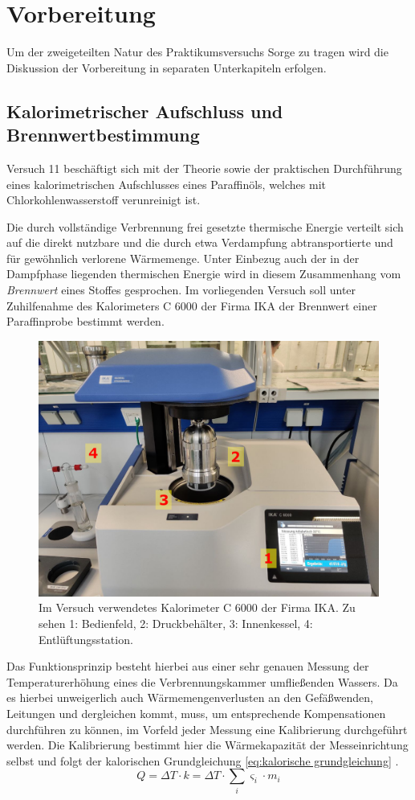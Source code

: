 \chapter{Vorbereitung}
	Um der zweigeteilten Natur des Praktikumsversuchs Sorge zu tragen wird die Diskussion der Vorbereitung in separaten Unterkapiteln
	erfolgen.
	\section{Kalorimetrischer Aufschluss und Brennwertbestimmung}\label{sec:vorbereitung kalorimetrischer aufschluss}
		Versuch 11 beschäftigt sich mit der Theorie sowie der praktischen Durchführung eines kalorimetrischen Aufschlusses
		eines Paraffinöls, welches mit Chlorkohlenwasserstoff verunreinigt ist.\par
		Die durch vollständige Verbrennung frei gesetzte thermische Energie verteilt sich auf die direkt nutzbare und die durch
		etwa Verdampfung abtransportierte und für gewöhnlich verlorene Wärmemenge. Unter Einbezug auch der in der Dampfphase liegenden
		thermischen Energie wird in diesem Zusammenhang vom \textit{Brennwert} eines Stoffes gesprochen.
		Im vorliegenden Versuch soll unter Zuhilfenahme des Kalorimeters C 6000 der Firma \textsc{IKA} der Brennwert einer Paraffinprobe
		bestimmt werden.
		\begin{figure}[h]
			\centering
			\includegraphics[width=.7\textwidth]{assets/photos/kaloriemeter_aufbau_edit.jpg}
			\caption[Im Versuch verwendetes Kalorimeter]{Im Versuch verwendetes Kalorimeter C 6000 der Firma \textsc{IKA}. Zu sehen 1: Bedienfeld, 2: Druckbehälter, 3: Innenkessel, 4: Entlüftungsstation.}
			\label{fig:kalorimeter aufbau}
		\end{figure}
		Das Funktionsprinzip besteht hierbei aus einer sehr genauen Messung der Temperaturerhöhung eines die Verbrennungskammer umfließenden
		Wassers. Da es hierbei unweigerlich auch Wärmemengenverlusten an den Gefäßwenden, Leitungen und dergleichen kommt, muss,
		um entsprechende Kompensationen durchführen zu können, im Vorfeld jeder Messung eine Kalibrierung durchgeführt werden.
		Die Kalibrierung bestimmt hier die Wärmekapazität der Messeinrichtung selbst und folgt der kalorischen Grundgleichung \cref{eq:kalorische grundgleichung} \cite{Einstieg.in.die.Physikalische.Chemie.fuer.Nebenfaechler.Bechmann.2016}.
		\begin{equation}
			Q = \Delta T \cdot k = \Delta T \cdot \sum_i \varsigma_i \cdot m_i
			\label{eq:kalorische grundgleichung}
		\end{equation}

